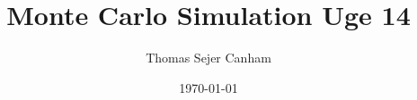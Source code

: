 \documentclass{article}
\title{Monte Carlo Simulation Uge 14}
\author{Thomas Sejer Canham}
\date{\today}
\theoremstyle{definition}
\theoremstyle{remark}
\begin{document}

\begin{titlepage}

    \maketitle
    \thispagestyle{empty}

\end{titlepage}
\end{document}
